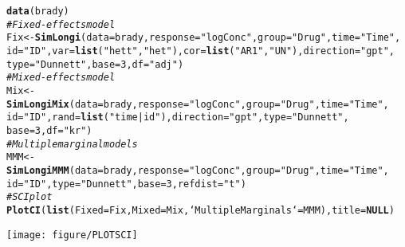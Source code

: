 \documentclass[a4paper]{article}\usepackage[]{graphicx}\usepackage[]{color}
\makeatletter
\def\maxwidth{ %
  \ifdim\Gin@nat@width>\linewidth
    \linewidth
  \else
    \Gin@nat@width
  \fi
}
\newcommand{\hlnum}[1]{\textcolor[rgb]{0.686,0.059,0.569}{#1}}%
\newcommand{\hlstr}[1]{\textcolor[rgb]{0.192,0.494,0.8}{#1}}%
\newcommand{\hlcom}[1]{\textcolor[rgb]{0.678,0.584,0.686}{\textit{#1}}}%
\newcommand{\hlstd}[1]{\textcolor[rgb]{0.345,0.345,0.345}{#1}}%
\newcommand{\hlkwa}[1]{\textcolor[rgb]{0.161,0.373,0.58}{\textbf{#1}}}%
\newcommand{\hlkwb}[1]{\textcolor[rgb]{0.69,0.353,0.396}{#1}}%
\newcommand{\hlkwc}[1]{\textcolor[rgb]{0.333,0.667,0.333}{#1}}%
\newcommand{\hlkwd}[1]{\textcolor[rgb]{0.737,0.353,0.396}{\textbf{#1}}}%
\newenvironment{kframe}{%
 \def\at@end@of@kframe{}%
 \ifinner\ifhmode%
  \def\at@end@of@kframe{\end{minipage}}%
  \begin{minipage}{\columnwidth}%
 \fi\fi%
 \def\FrameCommand##1{\hskip\@totalleftmargin \hskip-\fboxsep
 \colorbox{shadecolor}{##1}\hskip-\fboxsep
     \hskip-\linewidth \hskip-\@totalleftmargin \hskip\columnwidth}%
 \MakeFramed {\advance\hsize-\width
   \@totalleftmargin\z@ \linewidth\hsize
   \@setminipage}}%
 {\par\unskip\endMakeFramed%
 \at@end@of@kframe}
\newenvironment{knitrout}{}{} %
\makeatother
\begin{document}
\begin{knitrout}
\color{fgcolor}\begin{kframe}
\begin{alltt}
\hlkwd{data}\hlstd{(brady)}
\hlcom{# Fixed-effects model}
\hlstd{Fix} \hlkwb{<-} \hlkwd{SimLongi}\hlstd{(}\hlkwc{data} \hlstd{= brady,} \hlkwc{response} \hlstd{=} \hlstr{"logConc"}\hlstd{,} \hlkwc{group} \hlstd{=} \hlstr{"Drug"}\hlstd{,} \hlkwc{time} \hlstd{=} \hlstr{"Time"}\hlstd{,}
    \hlkwc{id} \hlstd{=} \hlstr{"ID"}\hlstd{,} \hlkwc{var} \hlstd{=} \hlkwd{list}\hlstd{(}\hlstr{"hett"}\hlstd{,} \hlstr{"het"}\hlstd{),} \hlkwc{cor} \hlstd{=} \hlkwd{list}\hlstd{(}\hlstr{"AR1"}\hlstd{,} \hlstr{"UN"}\hlstd{),} \hlkwc{direction} \hlstd{=} \hlstr{"gpt"}\hlstd{,}
    \hlkwc{type} \hlstd{=} \hlstr{"Dunnett"}\hlstd{,} \hlkwc{base} \hlstd{=} \hlnum{3}\hlstd{,} \hlkwc{df} \hlstd{=} \hlstr{"adj"}\hlstd{)}
\hlcom{# Mixed-effects model}
\hlstd{Mix} \hlkwb{<-} \hlkwd{SimLongiMix}\hlstd{(}\hlkwc{data} \hlstd{= brady,} \hlkwc{response} \hlstd{=} \hlstr{"logConc"}\hlstd{,} \hlkwc{group} \hlstd{=} \hlstr{"Drug"}\hlstd{,} \hlkwc{time} \hlstd{=} \hlstr{"Time"}\hlstd{,}
    \hlkwc{id} \hlstd{=} \hlstr{"ID"}\hlstd{,} \hlkwc{rand} \hlstd{=} \hlkwd{list}\hlstd{(}\hlstr{"time|id"}\hlstd{),} \hlkwc{direction} \hlstd{=} \hlstr{"gpt"}\hlstd{,} \hlkwc{type} \hlstd{=} \hlstr{"Dunnett"}\hlstd{,}
    \hlkwc{base} \hlstd{=} \hlnum{3}\hlstd{,} \hlkwc{df} \hlstd{=} \hlstr{"kr"}\hlstd{)}
\hlcom{# Multiple marginal models}
\hlstd{MMM} \hlkwb{<-} \hlkwd{SimLongiMMM}\hlstd{(}\hlkwc{data} \hlstd{= brady,} \hlkwc{response} \hlstd{=} \hlstr{"logConc"}\hlstd{,} \hlkwc{group} \hlstd{=} \hlstr{"Drug"}\hlstd{,} \hlkwc{time} \hlstd{=} \hlstr{"Time"}\hlstd{,}
    \hlkwc{id} \hlstd{=} \hlstr{"ID"}\hlstd{,} \hlkwc{type} \hlstd{=} \hlstr{"Dunnett"}\hlstd{,} \hlkwc{base} \hlstd{=} \hlnum{3}\hlstd{,} \hlkwc{refdist} \hlstd{=} \hlstr{"t"}\hlstd{)}
\hlcom{# SCI plot}
\hlkwd{PlotCI}\hlstd{(}\hlkwd{list}\hlstd{(}\hlkwc{Fixed} \hlstd{= Fix,} \hlkwc{Mixed} \hlstd{= Mix,} \hlkwc{`Multiple Marginals`} \hlstd{= MMM),} \hlkwc{title} \hlstd{=} \hlkwa{NULL}\hlstd{)}
\end{alltt}
\end{kframe}
\texttt{[image: figure/PLOTSCI]} 

\end{knitrout}


\clearpage


\nocite{*}



\end{document}
